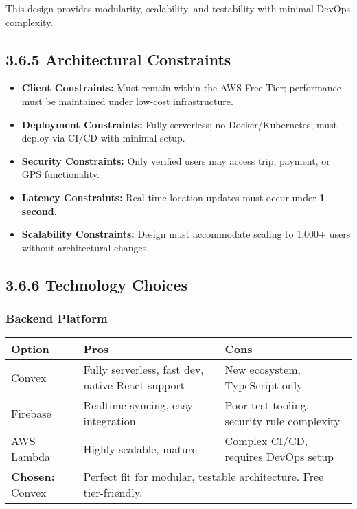 \documentclass[12pt]{article}
\begin{document}
This design provides modularity, scalability, and testability with minimal DevOps complexity.

\subsection{3.6.5 Architectural Constraints}
\begin{itemize}
  \item \textbf{Client Constraints:} Must remain within the AWS Free Tier; performance must be maintained under low-cost infrastructure.
  \item \textbf{Deployment Constraints:} Fully serverless; no Docker/Kubernetes; must deploy via CI/CD with minimal setup.
  \item \textbf{Security Constraints:} Only verified users may access trip, payment, or GPS functionality.
  \item \textbf{Latency Constraints:} Real-time location updates must occur under \textbf{1 second}.
  \item \textbf{Scalability Constraints:} Design must accommodate scaling to 1,000+ users without architectural changes.
\end{itemize}

\subsection{3.6.6 Technology Choices}

\subsubsection*{Backend Platform}
\begin{tabular}{|l|p{6cm}|p{6cm}|}
\hline
\textbf{Option} & \textbf{Pros} & \textbf{Cons} \\
\hline
Convex & Fully serverless, fast dev, native React support & New ecosystem, TypeScript only \\
\hline
Firebase & Realtime syncing, easy integration & Poor test tooling, security rule complexity \\
\hline
AWS Lambda & Highly scalable, mature & Complex CI/CD, requires DevOps setup \\
\hline
\textbf{Chosen:} Convex & \multicolumn{2}{l|}{Perfect fit for modular, testable architecture. Free tier-friendly.} \\
\hline
\end{tabular}

\vspace{1em}
\end{document}
